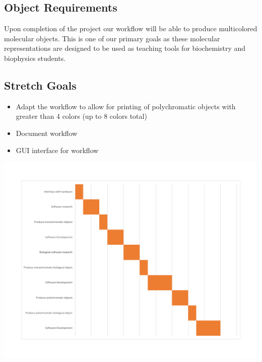 \documentclass[letterpaper, onecolumn, draftclsnofoot, 10pt, compsoc]{IEEEtran}
\begin{document}
    \subsection{Object Requirements}
    Upon completion of the project our workflow will be able to produce multicolored molecular objects. This is one of our primary goals as these molecular representations are designed to be used as teaching tools for biochemistry and biophysics students.
    
    \subsection{Stretch Goals}
    \begin{itemize}
    	\item Adapt the workflow to allow for printing of polychromatic objects with greater than 4 colors (up to 8 colors total)
        \item Document workflow
        \item GUI interface for workflow
    \end{itemize}

\newpage
{}
  \begin{center}
  \includegraphics[width=7in]{gantt}
  \end{center}
\end{document}
